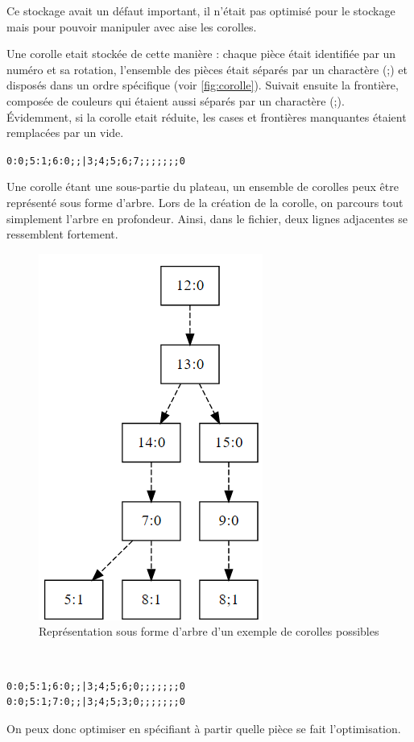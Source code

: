 	Ce stockage avait un défaut important, il n'était pas optimisé pour le stockage mais pour pouvoir manipuler avec aise les corolles.
	
	Une corolle etait stockée de cette manière : chaque pièce était identifiée par un numéro et sa rotation, l'ensemble des pièces était séparés par un charactère (;) et disposés dans un ordre spécifique (voir \autoref{fig:corolle}). Suivait ensuite la frontière, composée de couleurs qui étaient aussi séparés par un charactère (;). Évidemment, si la corolle etait réduite, les cases et frontières manquantes étaient remplacées par un vide.
	\begin{exmp}
		\lstinline[columns=fixed]{0:0;5:1;6:0;;|3;4;5;6;7;;;;;;;0}
	\end{exmp}
	
	Une corolle étant une sous-partie du plateau, un ensemble de corolles peux être représenté sous forme d'arbre. Lors de la création de la corolle, on parcours tout simplement l'arbre en profondeur. Ainsi, dans le fichier, deux lignes adjacentes se ressemblent fortement.
		\begin{figure}[H]
			\centering
			\includegraphics[width=0.3\linewidth]{images/corolle_tree}
			\caption{Représentation sous forme d'arbre d'un exemple de corolles possibles}
			\label{fig:corolle_tree}
		\end{figure}
	
	
	\begin{exmp}\ 
		
		\begin{lstlisting}
0:0;5:1;6:0;;|3;4;5;6;0;;;;;;;0
0:0;5:1;7:0;;|3;4;5;3;0;;;;;;;0
		\end{lstlisting}
		
	\end{exmp}
	
	On peux donc optimiser en spécifiant à partir quelle pièce se fait l'optimisation.
	
